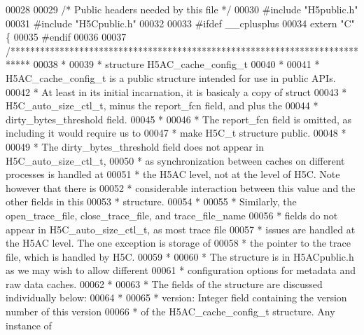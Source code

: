 \begin{DoxyCode}
00028 
00029 \textcolor{comment}{/* Public headers needed by this file */}
00030 \textcolor{preprocessor}{#include "H5public.h"}
00031 \textcolor{preprocessor}{#include "H5Cpublic.h"}
00032 
00033 \textcolor{preprocessor}{#ifdef \_\_cplusplus}
00034 \textcolor{keyword}{extern} \textcolor{stringliteral}{"C"} \{
00035 \textcolor{preprocessor}{#endif}
00036 
00037 \textcolor{comment}{/****************************************************************************}
00038 \textcolor{comment}{ *}
00039 \textcolor{comment}{ * structure H5AC\_cache\_config\_t}
00040 \textcolor{comment}{ *}
00041 \textcolor{comment}{ * H5AC\_cache\_config\_t is a public structure intended for use in public APIs.}
00042 \textcolor{comment}{ * At least in its initial incarnation, it is basicaly a copy of struct}
00043 \textcolor{comment}{ * H5C\_auto\_size\_ctl\_t, minus the report\_fcn field, and plus the}
00044 \textcolor{comment}{ * dirty\_bytes\_threshold field.}
00045 \textcolor{comment}{ *}
00046 \textcolor{comment}{ * The report\_fcn field is omitted, as including it would require us to}
00047 \textcolor{comment}{ * make H5C\_t structure public.}
00048 \textcolor{comment}{ *}
00049 \textcolor{comment}{ * The dirty\_bytes\_threshold field does not appear in H5C\_auto\_size\_ctl\_t,}
00050 \textcolor{comment}{ * as synchronization between caches on different processes is handled at}
00051 \textcolor{comment}{ * the H5AC level, not at the level of H5C.  Note however that there is}
00052 \textcolor{comment}{ * considerable interaction between this value and the other fields in this}
00053 \textcolor{comment}{ * structure.}
00054 \textcolor{comment}{ *}
00055 \textcolor{comment}{ * Similarly, the open\_trace\_file, close\_trace\_file, and trace\_file\_name}
00056 \textcolor{comment}{ * fields do not appear in H5C\_auto\_size\_ctl\_t, as most trace file}
00057 \textcolor{comment}{ * issues are handled at the H5AC level.  The one exception is storage of}
00058 \textcolor{comment}{ * the pointer to the trace file, which is handled by H5C.}
00059 \textcolor{comment}{ *}
00060 \textcolor{comment}{ * The structure is in H5ACpublic.h as we may wish to allow different}
00061 \textcolor{comment}{ * configuration options for metadata and raw data caches.}
00062 \textcolor{comment}{ *}
00063 \textcolor{comment}{ * The fields of the structure are discussed individually below:}
00064 \textcolor{comment}{ *}
00065 \textcolor{comment}{ * version: Integer field containing the version number of this version}
00066 \textcolor{comment}{ *      of the H5AC\_cache\_config\_t structure.  Any instance of}

\end{DoxyCode}
